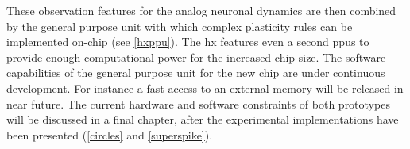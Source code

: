 These observation features for the analog neuronal dynamics are then combined by the general purpose unit with which complex plasticity rules can be implemented on-chip (see \cref{hxppu}). The \gls{hx} features even a second \glspl{ppu} to provide enough computational power for the increased chip size. The software capabilities of the general purpose unit for the new chip are under continuous development. For instance a fast access to an external memory will be released in near future. The current hardware and software constraints of both prototypes will be discussed in a final chapter, after the experimental implementations have been presented (\cref{circles} and \cref{superspike}).

